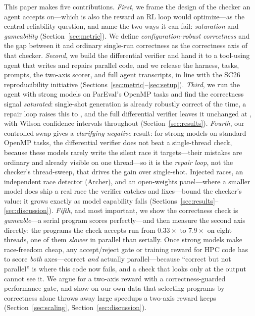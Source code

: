 \noindent This paper makes five contributions.
\emph{First}, we frame the design of the checker an agent accepts on---which is also the
reward an RL loop would optimize---as the central reliability question, and name the two
ways it can fail: \emph{saturation} and \emph{gameability} (Section~\ref{sec:metric}). We
define \emph{configuration-robust correctness} and the gap between it and ordinary
single-run correctness as the correctness axis of that checker.
\emph{Second}, we build the differential verifier and hand it to a tool-using agent that
writes and repairs parallel code, and we release the harness, tasks, prompts, the two-axis
scorer, and full agent transcripts, in line with the SC26 reproducibility initiative
(Sections~\ref{sec:metric}--\ref{sec:setup}).
\emph{Third}, we run the agent with strong models on ParEval's OpenMP tasks and find the
correctness signal \emph{saturated}: single-shot generation is already robustly correct
\Lzerorate{} of the time, a repair loop raises this to \Lonerate{}, and the full
differential verifier leaves it unchanged at \Ltworate{}, with Wilson confidence intervals
throughout (Section~\ref{sec:results}).
\emph{Fourth}, our controlled swap gives a \emph{clarifying negative} result: for
\Nmodels{} strong models on standard OpenMP tasks, the differential verifier does not beat
a single-thread check, because these models rarely write the silent race it targets---their
mistakes are ordinary and already visible on one thread---so it is the \emph{repair loop},
not the checker's thread-sweep, that drives the gain over single-shot. Injected races, an
independent race detector (Archer), and an open-weights panel---where a smaller model does
ship a real race the verifier catches and fixes---bound the checker's value: it grows
exactly as model capability falls (Sections~\ref{sec:results}--\ref{sec:discussion}).
\emph{Fifth}, and most important, we show the correctness check is \emph{gameable}---a
serial program scores perfectly---and then measure the second axis directly: the programs
the check accepts run from $0.33\times$ to $7.9\times$ on eight threads, one of them
\emph{slower} in parallel than serially. Once strong models make race-freedom cheap, any
accept/reject gate or training reward for HPC code has to score \emph{both} axes---correct
\emph{and} actually parallel---because ``correct but not parallel'' is where this code now
fails, and a check that looks only at the output cannot see it. We argue for a two-axis
reward with a correctness-guarded performance gate, and show on our own data that selecting
programs by correctness alone throws away large speedups a two-axis reward keeps
(Section~\ref{sec:scaling}, Section~\ref{sec:discussion}).

